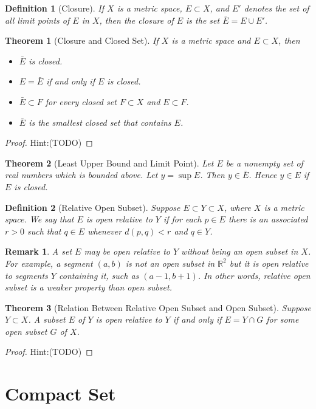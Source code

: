 \documentclass[onecolumn]{ctexart}
\theoremstyle{break}
\newtheorem{definition}{Definition}
\newtheorem{theorem}{Theorem}
\newtheorem{remark}{Remark}
\begin{document}
\begin{definition}[Closure]
  If $X$ is a metric space, $E \subset X$, and $E'$ denotes the set of all limit 
  points of $E$ in $X$, then the closure of $E$ is the set $\bar{E} = E \cup E'$.
\end{definition}

\begin{theorem}[Closure and Closed Set]
  If $X$ is a metric space and $E \subset X$, then
  \begin{itemize}
    \item $\bar{E}$ is closed.
    \item $E = \bar{E}$ if and only if $E$ is closed.
    \item $\bar{E} \subset F$ for every closed set $F \subset X$ and $E \subset 
    F$.
    \item $\bar{E}$ is the smallest closed set that contains $E$.
  \end{itemize}
\end{theorem}
\begin{proof}
  Hint:(TODO)
\end{proof}

\begin{theorem}[Least Upper Bound and Limit Point]
  Let $E$ be a nonempty set of real numbers which is bounded above. Let $y = 
  \sup E$. Then $y \in \bar{E}$. Hence $y \in E$ if $E$ is closed.
\end{theorem}

\begin{definition}[Relative Open Subset]
  Suppose $E \subset Y \subset X$, where $X$ is a metric space. We say that $E$ 
  is open relative to $Y$ if for each $p \in E$ there is an associated $r > 0$ 
  such that $q \in E$ whenever $d(p, q) < r$ and $q \in Y$.
\end{definition}
\begin{remark}
  A set $E$ may be open relative to $Y$ without being an open subset in $X$. For 
  example, a segment $(a, b)$ is not an open subset in $\mathbb{R}^2$ but it is 
  open relative to segments $Y$ containing it, such as $(a-1, b+1)$. In other 
  words, relative open subset is a weaker property than open subset.
\end{remark}

\begin{theorem}[Relation Between Relative Open Subset and Open Subset]
  Suppose $Y \subset X$. A subset $E$ of $Y$ is open relative to $Y$ if and only 
  if $E = Y \cap G$ for some open subset $G$ of $X$.
\end{theorem}
\begin{proof}
  Hint:(TODO)
\end{proof}

\section{Compact Set}
\end{document}

